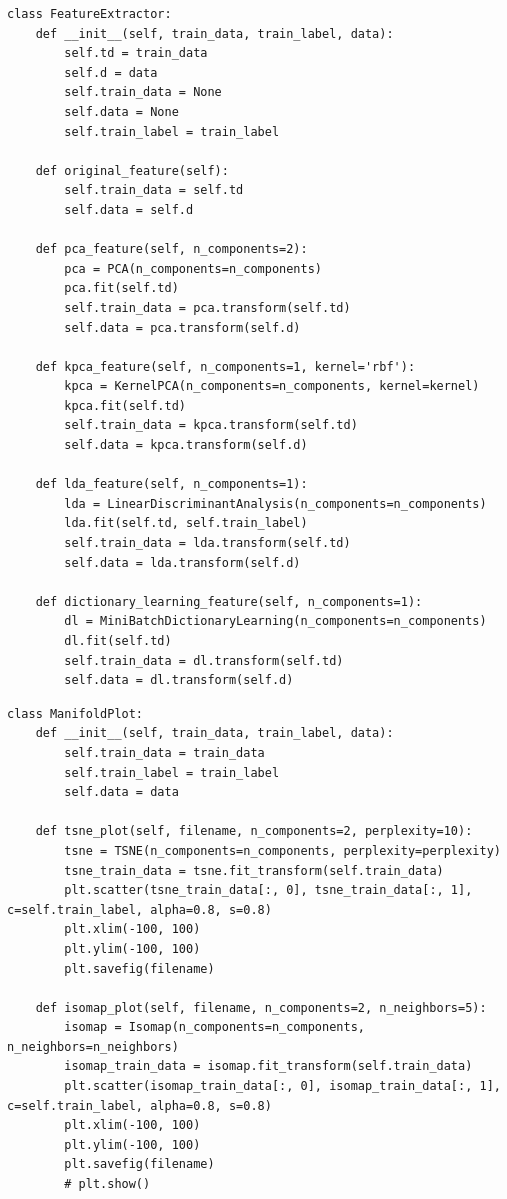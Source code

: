 \documentclass[12pt,hyperref,a4paper,UTF8]{ctexart}
\begin{document}
{{\begin{mdframed}[style=codebox]
\begin{lstlisting}
class FeatureExtractor:
    def __init__(self, train_data, train_label, data):
        self.td = train_data
        self.d = data
        self.train_data = None
        self.data = None
        self.train_label = train_label

    def original_feature(self):
        self.train_data = self.td
        self.data = self.d

    def pca_feature(self, n_components=2):
        pca = PCA(n_components=n_components)
        pca.fit(self.td)
        self.train_data = pca.transform(self.td)
        self.data = pca.transform(self.d)

    def kpca_feature(self, n_components=1, kernel='rbf'):
        kpca = KernelPCA(n_components=n_components, kernel=kernel)
        kpca.fit(self.td)
        self.train_data = kpca.transform(self.td)
        self.data = kpca.transform(self.d)

    def lda_feature(self, n_components=1):
        lda = LinearDiscriminantAnalysis(n_components=n_components)
        lda.fit(self.td, self.train_label)
        self.train_data = lda.transform(self.td)
        self.data = lda.transform(self.d)

    def dictionary_learning_feature(self, n_components=1):
        dl = MiniBatchDictionaryLearning(n_components=n_components)
        dl.fit(self.td)
        self.train_data = dl.transform(self.td)
        self.data = dl.transform(self.d)
\end{lstlisting}
\end{mdframed}



\begin{mdframed}[style=codebox]
\begin{lstlisting}
class ManifoldPlot:
    def __init__(self, train_data, train_label, data):
        self.train_data = train_data
        self.train_label = train_label
        self.data = data

    def tsne_plot(self, filename, n_components=2, perplexity=10):
        tsne = TSNE(n_components=n_components, perplexity=perplexity)
        tsne_train_data = tsne.fit_transform(self.train_data)
        plt.scatter(tsne_train_data[:, 0], tsne_train_data[:, 1], c=self.train_label, alpha=0.8, s=0.8)
        plt.xlim(-100, 100)
        plt.ylim(-100, 100)
        plt.savefig(filename)

    def isomap_plot(self, filename, n_components=2, n_neighbors=5):
        isomap = Isomap(n_components=n_components, n_neighbors=n_neighbors)
        isomap_train_data = isomap.fit_transform(self.train_data)
        plt.scatter(isomap_train_data[:, 0], isomap_train_data[:, 1], c=self.train_label, alpha=0.8, s=0.8)
        plt.xlim(-100, 100)
        plt.ylim(-100, 100)
        plt.savefig(filename)
        # plt.show()


\end{lstlisting}
\end{mdframed}}}
\end{document}
